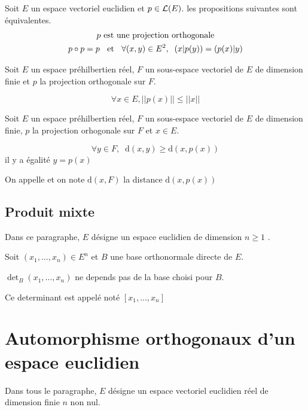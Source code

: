 \begin{prp}
Soit $E$ un espace vectoriel euclidien et $p \in \operatorname{\mathcal{L}}(E)$.
les propositions suivantes sont équivalentes.
\begin{gather*}
    p \text{ est une projection orthogonale} \\
    p \circ p = p \;\;\text{ et }\;\;
    \forall (x, y) \in E^2, \;\; (x|p(y)) = (p(x)|y)
\end{gather*}
\end{prp}

\begin{prp}
Soit $E$ un espace préhilbertien réel, $F$ un sous-espace vectoriel de
$E$ de dimension finie et $p$ la projection orthogonale sur $F$.

\[
    \forall x \in E, ||p(x)|| \leq ||x||
\]
\end{prp}

\begin{dfn}
Soit $E$ un espace préhilbertien réel, $F$ un sous-espace vectoriel
de $E$ de dimension finie, $p$ la projection orhogonale sur $F$ et
$x \in E$.

\[
    \forall y \in F, \;\; \mathrm{d}(x, y) \geq \mathrm{d}(x, p(x))
\]
il y a égalité \ssi $y = p(x)$

On appelle  et on note
$\mathrm{d}(x, F)$ la distance $\mathrm{d}(x, p(x))$
\end{dfn}


\subsection{Produit mixte}
Dans ce paragraphe, $E$ désigne un espace euclidien de dimension $n \geq 1$
.

\begin{dfn}
Soit $(x_1, \ldots, x_n) \in E^n$ et $B$ une base orthonormale
directe de $E$.

$\det_B(x_1, \ldots, x_n)$ ne depends pas de la base choisi pour $B$.

Ce determinant est appelé 
noté $[x_1, \ldots, x_n]$
\end{dfn}

\section{Automorphisme orthogonaux d'un espace euclidien}

Dans tous le paragraphe, $E$ désigne un espace vectoriel euclidien réel
de dimension finie $n$ non nul.

